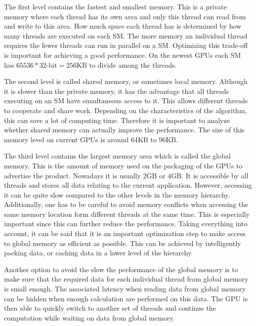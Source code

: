 The first level contains the fastest and smallest memory. This is a private memory where each thread has its own area and only this thread can read from and write to this area. How much space each thread has is determined by how many threads are executed on each SM. The more memory an individual thread requires the fewer threads can run in parallel on a SM. Optimizing this trade-off is important for achieving a good performance. On the newest GPUs each SM has $65536 * 32\text{-bit} = 256\text{KB}$ to divide among the threads.

The second level is called shared memory, or sometimes local memory. Although it is slower than the private memory, it has the advantage that all threads executing on an SM have simultaneous access to it. This allows different threads to cooperate and share work. Depending on the characteristics of the algorithm, this can save a lot of computing time. Therefore it is important to analyze whether shared memory can actually improve the performance. The size of this memory level on current GPUs is around $64\text{KB}$ to $96\text{KB}$.

The third level contains the largest memory area which is called the global memory. This is the amount of memory used  on the packaging of the GPUs to advertise the product. Nowadays it is usually $2\text{GB}$ or $4\text{GB}$. It is accessible by all threads and stores all data relating to the current application. However, accessing it can be quite slow compared to the other levels in the memory hierarchy. Additionally, one has to be careful to avoid memory conflicts when accessing the same memory location form different threads at the same time. This is especially important since this can further reduce the performance. Taking everything into account, it can be said that it is an important optimization step to make access to global memory as efficient as possible. This can be achieved by intelligently packing data, or caching data in a lower level of the hierarchy. 

Another option to avoid the slow the performance of the global memory is to make sure that the required data for each individual thread from global memory is small enough. The associated latency when reading data from global memory can be hidden when enough calculation are performed on this data. The GPU is then able to quickly switch to another set of threads and continue the computation while waiting on data from global memory.

